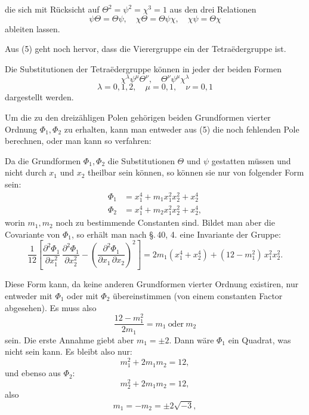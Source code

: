 die sich mit Rücksicht auf $\Theta^2 = \psi^2 = \chi^3 = 1$ aus den drei
Relationen
\[
\psi\Theta = \Theta\psi, \quad \chi\Theta = \Theta\psi\chi, \quad \chi\psi = \Theta\chi
\]
ableiten lassen.

Aus (5) geht noch hervor, dass die Vierergruppe
ein  der Tetraëdergruppe ist.

Die Substitutionen der Tetraëdergruppe können in jeder der
beiden Formen
\[
\chi^\lambda \psi^\mu \Theta^\nu, \quad \Theta^\nu \psi^\mu \chi^\lambda
\]
\[
\lambda = 0, 1, 2, \quad \mu = 0, 1, \quad \nu = 0, 1
\]
dargestellt werden.

Um die zu den dreizähligen Polen gehörigen beiden Grundformen
 vierter Ordnung $\Phi_1, \Phi_2$ zu erhalten, kann man entweder
aus (5) die noch fehlenden Pole berechnen, oder man kann so
verfahren:

Da die Grundformen $\Phi_1, \Phi_2$ die Substitutionen $\Theta$ und $\psi$
gestatten müssen und nicht durch $x_1$ und $x_2$ theilbar sein können,
so können sie nur von folgender Form sein:
\[
\begin{aligned}
\Phi_1 &= x_1^4 + m_1 x_1^2 x_2^2 + x_2^4 \\
\Phi_2 &= x_1^4 + m_2 x_1^2 x_2^2 + x_2^4,
\end{aligned}
\]
worin $m_1, m_2$ noch zu bestimmende Constanten sind. Bildet man
aber die  Covariante von $\Phi_1$, so erhält man nach
\S.\,40, 4. eine Invariante der Gruppe:
\[
\frac{1}{12}\left[\frac{\partial^2 \Phi_1}{\partial x_1^2}\,\frac{\partial^2 \Phi_1}{\partial x_2^2} - \left(\frac{\partial^2 \Phi_1}{\partial x_1\,\partial x_2}\right)^2\right] = 2m_1(x_1^4+x_2^4) + (12-m_1^2)\,x_1^2 x_2^2.
\]

Diese Form kann, da keine anderen Grundformen vierter
Ordnung existiren, nur entweder mit $\Phi_1$ oder mit $\Phi_2$ übereinstimmen
 (von einem constanten Factor abgesehen). Es muss also
\[
\frac{12-m_1^2}{2m_1} = m_1 \ \text{oder}\ m_2
\]
sein. Die erste Annahme giebt aber $m_1 = \pm 2$. Dann wäre $\Phi_1$
ein Quadrat, was nicht sein kann. Es bleibt also nur:
\[
m_1^2 + 2m_1 m_2 = 12,
\]
und ebenso aus $\Phi_2$:
\[
m_2^2 + 2m_1 m_2 = 12,
\]
also
\[
m_1 = -m_2 = \pm 2\sqrt{-3},
\]
